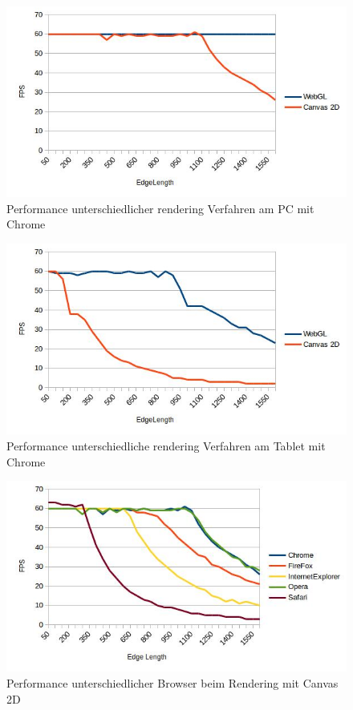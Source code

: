 \begin{figure}[pt]
	\centering
	\includegraphics[width=0.7\linewidth]{img/c4_stat_renderer_pc_chorme.jpg}
	\caption{Performance unterschiedlicher rendering Verfahren am PC mit Chrome}
	\label{fig:stat_renderer_pc_chorme}
\end{figure}

\begin{figure}[pt]
	\centering
	\includegraphics[width=0.7\linewidth]{img/c4_stat_renderer_tablet_chorme.jpg}
	\caption{Performance unterschiedliche rendering Verfahren am Tablet mit Chrome}
	\label{fig:stat_renderer_tablet_chorme}
\end{figure}

\begin{figure}[pt]
	\centering
	\includegraphics[width=0.7\linewidth]{img/c4_stat_browser_js_pc.jpg}
	\caption{Performance unterschiedlicher Browser beim Rendering mit Canvas 2D}
	\label{fig:stat_browser_js_pc}
\end{figure}

